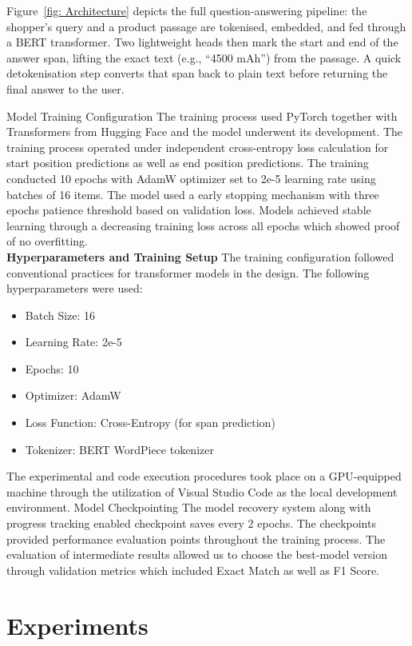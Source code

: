 \documentclass[10pt,conference]{IEEEtran}
\begin{document}
Figure~\ref{fig: Architecture} depicts the full question‑answering pipeline: the shopper’s query and a product passage are tokenised, embedded, and fed through a BERT transformer. Two lightweight heads then mark the start and end of the answer span, lifting the exact text (e.g., “4500 mAh”) from the passage. A quick detokenisation step converts that span back to plain text before returning the final answer to the user.

Model Training Configuration
The training process used PyTorch together with Transformers from Hugging Face and the model underwent its development. The training process operated under independent cross-entropy loss calculation for start position predictions as well as end position predictions. The training conducted 10 epochs with AdamW optimizer set to 2e-5 learning rate using batches of 16 items. The model used a early stopping mechanism with three epochs patience threshold based on validation loss. Models achieved stable learning through a decreasing training loss across all epochs which showed proof of no overfitting. \\

\textbf{Hyperparameters and Training Setup}
The training configuration followed conventional practices for transformer models in the design. The following hyperparameters were used:
\begin{itemize}
    \item Batch Size: 16
    \item Learning Rate: 2e-5
    \item Epochs: 10
    \item Optimizer: AdamW
    \item Loss Function: Cross-Entropy (for span prediction)
    \item Tokenizer: BERT WordPiece tokenizer
\end{itemize}

The experimental and code execution procedures took place on a GPU-equipped machine through the utilization of Visual Studio Code as the local development environment.
Model Checkpointing
The model recovery system along with progress tracking enabled checkpoint saves every 2 epochs. The checkpoints provided performance evaluation points throughout the training process. The evaluation of intermediate results allowed us to choose the best-model version through validation metrics which included Exact Match as well as F1 Score.


\section{Experiments}
\end{document}
